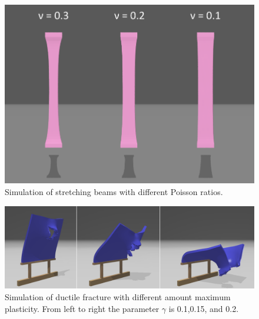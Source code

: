 \begin{figure}[t]
  \centering
  \includegraphics[width=\linewidth]{./figs/compare_different_poisson_ratio.png}
  \caption{\label{fig:7}
  Simulation of stretching beams with different Poisson ratios.
}
\end{figure}
\begin{figure}[t]
  \centering
  \includegraphics[width=\linewidth]{./figs/demo_impact_upside_plastic_fracture.png}
  \caption{\label{fig:8}
  Simulation of ductile fracture with different amount maximum plasticity. From left to right the parameter $\gamma$ is 0.1,0.15, and 0.2.
}
\end{figure}
